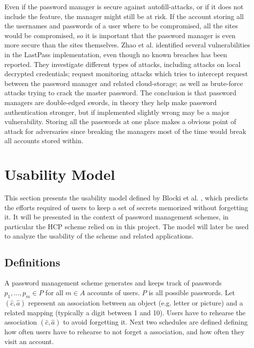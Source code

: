 \par Even if the password manager is secure against autofill-attacks, or if it does not include the feature, the manager might still be at risk. If the account storing all the usernames and passwords of a user where to be compromised, all the sites would be compromised, so it is important that the password manager is even more secure than the sites themselves. Zhao et al. \cite{lastpass-security} identified several vulnerabilities in the LastPass implementation, even though no known breaches has been reported. They investigate different types of attacks, including attacks on local decrypted credentials; request monitoring attacks which tries to intercept request between the password manager and related cloud-storage; as well as brute-force attacks trying to crack the master password. The conclusion is that password managers are double-edged swords, in theory they help make password authentication stronger, but if implemented slightly wrong may be a major vulnerability. Storing all the passwords at one place makes a obvious point of attack for adversaries since breaking the managers most of the time would break all accounts stored within.



\section{Usability Model}\label{sec:usability-model}
This section presents the usability model defined by Blocki et al. \cite{naturally-rehearsing}, which predicts the efforts required of users to keep a set of secrets memorized without forgetting it. It will be presented in the context of password management schemes, in particular the HCP scheme relied on in this project. The model will later be used to analyze the usability of the scheme and related applications.

\subsection{Definitions}
A password management scheme generates and keeps track of passwords $p_1, \dots, p_m \in P$ for all $m \in A$ accounts of users. $P$ is all possible passwords. Let $(\hat c, \hat a)$ represent an association between an object (e.g. letter or picture) and a related  mapping (typically a digit between 1 and 10). Users have to rehearse the association $(\hat c, \hat a)$ to avoid forgetting it. Next two schedules are defined defining how often users have to rehearse to not forget a association, and how often they visit an account.

